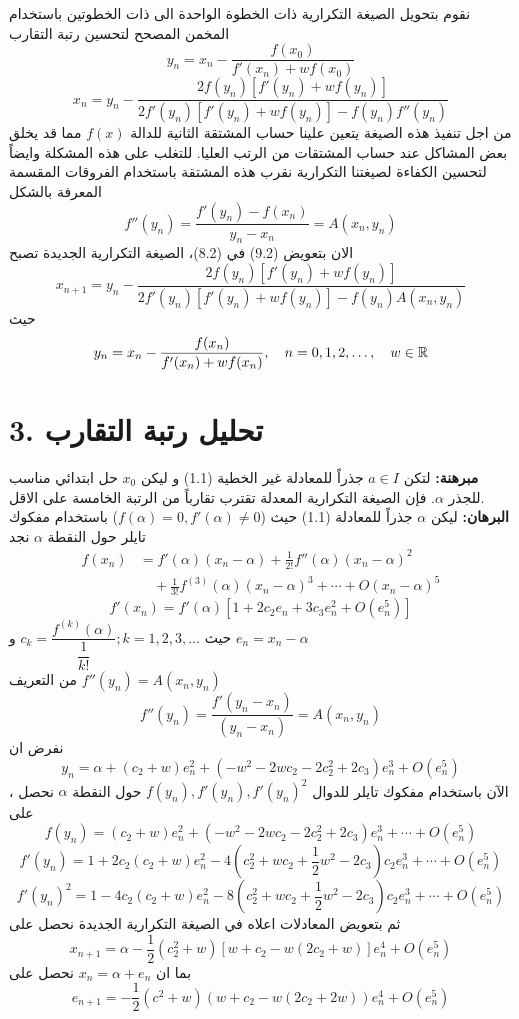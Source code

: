 نقوم بتحويل الصيغة التكرارية ذات الخطوة الواحدة الى ذات الخطوتين باستخدام المخمن المصحح لتحسين رتبة التقارب
\[
y_n = x_n - \frac{f(x_0)}{f'(x_n)+wf(x_0)}
\]
\begin{equation}
x_{n} = y_n - \frac{2f(y_n)[f'(y_n)+wf(y_n)]}{2f'(y_n)[f'(y_n)+wf(y_n)] - f(y_n)f''(y_n)} 
\end{equation}
من اجل تنفيذ هذه الصيغة يتعين علينا حساب المشتقة الثانية للدالة $f(x)$ مما قد يخلق بعض المشاكل عند حساب المشتقات من الرتب العليا. للتغلب على هذه المشكلة وايضاً لتحسين الكفاءة لصيغتنا التكرارية نقرب هذه المشتقة باستخدام الفروقات المقسمة المعرفة بالشكل
\begin{equation}
f''(y_n) = \frac{f'(y_n) - f(x_n)}{y_n - x_n} = A(x_n, y_n)
\end{equation}
الان بتعويض (9.2) في (8.2)، الصيغة التكرارية الجديدة تصبح
\begin{equation}
x_{n+1} = y_n - \frac{2f(y_n)[f'(y_n)+wf(y_n)]}{2f'(y_n) [f'(y_n) + wf(y_n)] -f(y_n)A(x_n, y_n)} 
\end{equation}
حيث
\begin{equation}
	y_n = x_n - \frac{f(x_n)}{f'(x_n) + wf(x_n)}, \quad n=0,1,2,\dots, \quad w\in\mathbb{R}
\end{equation}

\section*{3. تحليل رتبة التقارب}
\textbf{مبرهنة:} لتكن $a\in I$ جذراً للمعادلة غير الخطية (1.1) و ليكن $x_0$ حل ابتدائي مناسب للجذر $\alpha$. فإن الصيغة التكرارية المعدلة تقترب تقارباً من الرتبة الخامسة على الاقل.\\
\textbf{البرهان:} ليكن $\alpha$ جذراً للمعادلة (1.1) حيث ($f(\alpha)=0, f'(\alpha)\neq 0$) باستخدام مفكوك تايلر حول النقطة $\alpha$ نجد
\begin{align*}
	f(x_n) &= f'(\alpha)(x_n-\alpha) + \frac{1}{2!} f''(\alpha)(x_n-\alpha)^2\\
	&\quad + \frac{1}{3!} f^{(3)}(\alpha) (x_n-\alpha)^3 + \cdots + O(x_n-\alpha)^5
\end{align*}
\[
f'(x_n) = f'(\alpha) [1 + 2c_2e_n + 3c_3 e_n^2 + O(e_n^5)]
\]
حيث 
$c_k = \dfrac{f^{(k)}(\alpha)}{\dfrac{1}{k!}}; k=1,2,3,\dots$
و $e_n = x_n-\alpha$\\[10pt]
من التعريف
$f''(y_n) = A(x_n, y_n)$
\[
f''(y_n) = \frac{f'(y_n - x_n)}{(y_n - x_n)} = A(x_n, y_n)
\]
نفرض ان 
\[
y_n = \alpha + (c_2+w)e_n^2 + (-w^2-2wc_2-2c_2^2+2c_3)e_n^3 + O(e_n^{5})
\]
  ، الآن باستخدام مفكوك تايلر للدوال $f(y_n), f'(y_n) , f'(y_n)^2 $ حول النقطة $\alpha$ نحصل على 
\[
f(y_n) = (c_2+w)e_n^2 +  (-w^2-2wc_2-2c_2^2+2c_3)e_n^3 + \cdots + O(e_n^5)
\]
\[
f'(y_n) = 1 + 2c_2 (c_2+w)e_n^2 - 4(c_2^2 + wc_2+\frac{1}{2}w^2 - 2c_3)c_2e_n^3+\cdots+O(e_n^5)
\]
\[
f'(y_n)^2 = 1-4c_2(c_2+w)e_n^2 - 8(c_2^2 + wc_2 + \frac{1}{2}w^2-2c_3)c_2e_n^3 + \cdots +O(e_n^5)
\]
ثم بتعويض المعادلات اعلاه في الصيغة التكرارية الجديدة نحصل على 
\[
x_{n+1} = \alpha - \frac{1}{2}(c_2^2 + w)[w+c_2-w(2c_2+w)]e_n^4  + O(e_n^5)
\]
بما ان $x_n = \alpha +e_n$ نحصل على 
\[
e_{n+1} = -\frac{1}{2}(c^2 + w)(w+c_2-w(2c_2+2w))e_n^4 + O(e_n^5)
\]